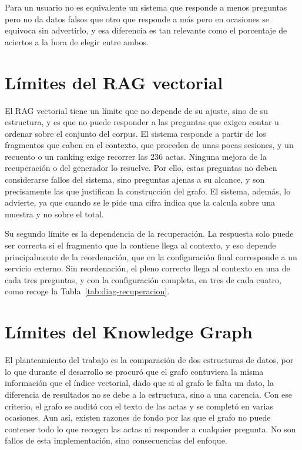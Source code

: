 \documentclass[11pt, a4paper]{report}
\begin{document}
	Para un usuario no es equivalente un sistema que responde a menos preguntas
	pero no da datos falsos que otro que responde a más pero en ocasiones se
	equivoca sin advertirlo, y esa diferencia es tan relevante como el porcentaje
	de aciertos a la hora de elegir entre ambos.

	\section{Límites del RAG vectorial}
	\label{sec:limites-vectorial}

	El RAG vectorial tiene un límite que no depende de su ajuste, sino de su
	estructura, y es que no puede responder a las preguntas que exigen contar u ordenar
	sobre el conjunto del corpus. El sistema responde a partir de los fragmentos
	que caben en el contexto, que proceden de unas pocas sesiones, y un recuento o
	un ranking exige recorrer las 236 actas. Ninguna mejora de la recuperación o
	del generador lo resuelve. Por ello, estas preguntas no deben considerarse
	fallos del sistema, sino preguntas ajenas a su alcance, y son precisamente las
	que justifican la construcción del grafo. El sistema, además, lo advierte, ya que
	cuando se le pide una cifra indica que la calcula sobre una muestra y no
	sobre el total.

	Su segundo límite es la dependencia de la recuperación. La respuesta solo
	puede ser correcta si el fragmento que la contiene llega al contexto, y eso depende principalmente de la reordenación, que en la configuración final
	corresponde a un servicio externo. Sin reordenación, el pleno correcto llega
	al contexto en una de cada tres preguntas, y con la configuración completa, en
	tres de cada cuatro, como recoge la Tabla~\ref{tab:diag-recuperacion}.

	\section{Límites del Knowledge Graph}
	\label{sec:limites-grafo}

	El planteamiento del trabajo es la comparación de dos estructuras de datos,
	por lo que durante el desarrollo se procuró que el grafo contuviera la misma
	información que el índice vectorial, dado que si al grafo le falta un dato, la
	diferencia de resultados no se debe a la estructura, sino a una carencia. Con
	ese criterio, el grafo se auditó con el texto de las actas y se completó en
	varias ocasiones. Aun así, existen razones de fondo por las que el grafo no
	puede contener todo lo que recogen las actas ni responder a cualquier
	pregunta. No son fallos de esta implementación, sino consecuencias del
	enfoque.
\end{document}
